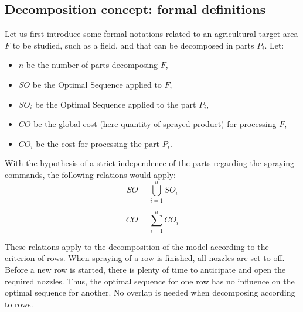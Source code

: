 
\subsection{Decomposition concept: formal definitions}
\label{DecompoConcept} \label{sec:DecompoConcept}

Let us first introduce some formal notations related to an agricultural target area $F$ to be studied, such as a field, and that can be decomposed in parts $P_i$. Let:
\begin {itemize}
\item $ n $ be the number of parts decomposing $F$,
\item $ SO $ be the Optimal Sequence applied to $F$, 
\item $ SO_i $ be the Optimal Sequence applied to the part $P_i$,
\item $ CO $ be the global cost (here quantity of sprayed product) for processing $F$,
\item $ CO_i $ be the cost for processing the part $P_i$.
\end {itemize}

With the hypothesis of a strict independence of the parts regarding the spraying commands, the following relations would apply:
\begin{equation} \label{eq:SOSOi}
    SO = \overset{n}{\underset{i=1}{\bigcup}} SO_{i}
\end{equation}

\begin{equation} \label{eq:COCOi}
    CO = \overset{n}{\underset{i=1}{\sum}} CO_{i}
\end{equation}


These relations apply to the decomposition of the model according to the criterion of rows. When spraying of a row is finished, all nozzles are set to off. Before a new row is started, there is plenty of time to anticipate and open the required nozzles. Thus, the optimal sequence for one row has no influence on the optimal sequence for another. No overlap is needed when decomposing according to rows. 

